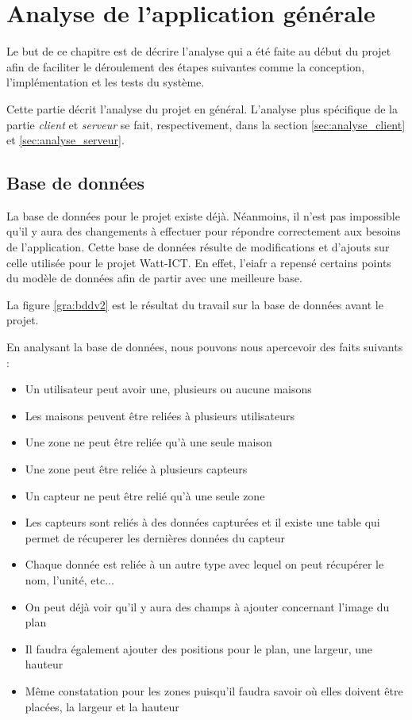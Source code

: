 
\chapter{Analyse de l'application générale}
Le but de ce chapitre est de décrire l'analyse qui a été faite au début du projet afin de faciliter le déroulement des étapes suivantes comme la conception, l'implémentation et les tests du système.

\medskip

Cette partie décrit l'analyse du projet en général. L'analyse plus spécifique de la partie \emph{client} et \emph{serveur} se fait, respectivement, dans la section \ref{sec:analyse_client} et \ref{sec:analyse_serveur}.

\section{Base de données} %
\label{sec:base_de_donn_es}
La base de données pour le projet existe déjà. Néanmoins, il n'est pas impossible qu'il y aura des changements à effectuer pour répondre correctement aux besoins de l'application. Cette base de données résulte de modifications et d'ajouts sur celle utilisée pour le projet Watt-ICT. En effet, l'\gls{eiafr} a repensé certains points du modèle de données afin de partir avec une meilleure base.

\medskip

La figure \ref{gra:bddv2} est le résultat du travail sur la base de données avant le projet.

\medskip

En analysant la base de données, nous pouvons nous apercevoir des faits suivants : 

\medskip

\begin{itemize}
    \item Un utilisateur peut avoir une, plusieurs ou aucune maisons
    \item Les maisons peuvent être reliées à plusieurs utilisateurs
    \item Une zone ne peut être reliée qu'à une seule maison
    \item Une zone peut être reliée à plusieurs capteurs
    \item Un capteur ne peut être relié qu'à une seule zone
    \item Les capteurs sont reliés à des données capturées et il existe une table qui permet de récuperer les dernières données du capteur
    \item Chaque donnée est reliée à un autre type avec lequel on peut récupérer le nom, l'unité, etc...
    \item On peut déjà voir qu'il y aura des champs à ajouter concernant l'image du plan
    \item Il faudra également ajouter des positions pour le plan, une largeur, une hauteur
    \item Même constatation pour les zones puisqu'il faudra savoir où elles doivent être placées, la largeur et la hauteur
\end{itemize}


